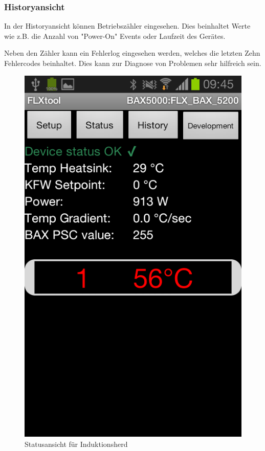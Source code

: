\subsubsection{Historyansicht}
\label{subsubsec:Ansichten}
In der Historyansicht können Betriebszähler eingesehen. Dies beinhaltet Werte wie z.B. die Anzahl von "Power-On" Events oder Laufzeit des Gerätes.

Neben den Zähler kann ein Fehlerlog eingesehen werden, welches die letzten Zehn Fehlercodes beinhaltet. Dies kann zur Diagnose von Problemen sehr hilfreich sein.

\begin{figure}
	\includegraphics[scale=0.3]{analysis/res/ShowStatusInduction}
	\caption{Statusansicht für Induktionsherd}
\end{figure}


